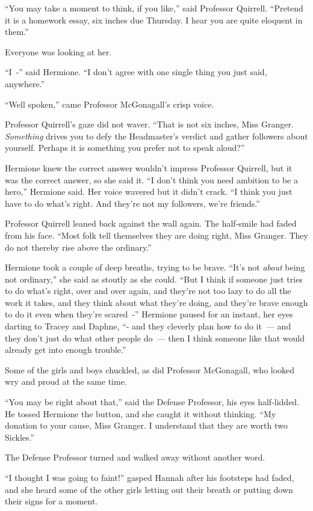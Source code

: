 ``You may take a moment to think, if you like,'' said Professor Quirrell. ``Pretend it is a homework essay, six inches due Thursday. I hear you are quite eloquent in them.''

Everyone was looking at her.

``I~-'' said Hermione. ``I don't agree with one single thing you just said, anywhere.''

``Well spoken,'' came Professor McGonagall's crisp voice.

Professor Quirrell's gaze did not waver. ``That is not six inches, Miss Granger. \emph{Something} drives you to defy the Headmaster's verdict and gather followers about yourself. Perhaps it is something you prefer not to speak aloud?''

Hermione knew the correct answer wouldn't impress Professor Quirrell, but it was the correct answer, so she said it. ``I don't think you need ambition to be a hero,'' Hermione said. Her voice wavered but it didn't crack. ``I think you just have to do what's right. And they're not my followers, we're friends.''

Professor Quirrell leaned back against the wall again. The half-smile had faded from his face. ``Most folk tell themselves they are doing right, Miss Granger. They do not thereby rise above the ordinary.''

Hermione took a couple of deep breaths, trying to be brave. ``It's not \emph{about} being not ordinary,'' she said as stoutly as she could. ``But I think if someone just tries to do what's right, over and over again, and they're not too lazy to do all the work it takes, and they think about what they're doing, and they're brave enough to do it even when they're scared~-'' Hermione paused for an instant, her eyes darting to Tracey and Daphne, ``- and they cleverly plan how to do it~--- and they don't just do what other people do~--- then I think someone like that would already get into enough trouble.''

Some of the girls and boys chuckled, as did Professor McGonagall, who looked wry and proud at the same time.

``You may be right about that,'' said the Defense Professor, his eyes half-lidded. He tossed Hermione the button, and she caught it without thinking. ``My donation to your cause, Miss Granger. I understand that they are worth two Sickles.''

The Defense Professor turned and walked away without another word.

``I thought I was going to faint!'' gasped Hannah after his footsteps had faded, and she heard some of the other girls letting out their breath or putting down their signs for a moment.


